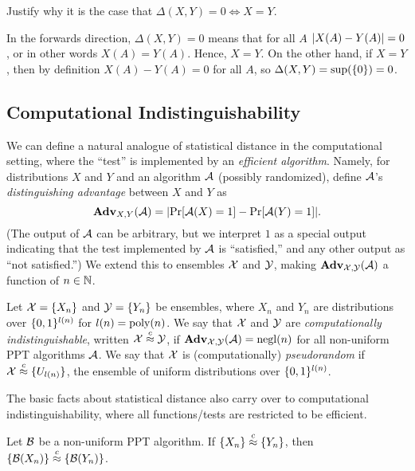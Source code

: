 \documentclass[11pt]{article}
\begin{document}
\begin{question}
    Justify why it is the case that $\Delta(X,Y) = 0 \iff X = Y$.
\end{question}
\begin{answer}
    In the forwards direction, $\Delta(X,Y) = 0$ means that for all $A$ $\lvert X(A) -
    Y(A)\rvert = 0$, or in other words $X(A) = Y(A)$. Hence, $X = Y$. On the other hand,
    if $X = Y$, then by definition $X(A) - Y(A) = 0$ for all $A$, so $\Delta(X,Y)
    = \sup(\{0\}) = 0$.
\end{answer}

\subsection{Computational Indistinguishability}
\label{sec:comp-indist}

We can define a natural analogue of statistical distance in the
computational setting, where the ``test'' is implemented by an
\emph{efficient algorithm}.  Namely, for distributions $X$ and $Y$ and
an algorithm $\mathcal{A}$ (possibly randomized), define $\mathcal{A}$'s
\emph{distinguishing advantage} between $X$ and $Y$ as \[
\advan_{X,Y}(\Adv) = \abs*{\Pr[\Adv(X)=1] - \Pr[\Adv(Y)=1]}. \] (The
output of $\mathcal{A}$ can be arbitrary, but we interpret $1$ as a special
output indicating that the test implemented by $\mathcal{A}$ is
``satisfied,'' and any other output as ``not satisfied.'')  We extend
this to ensembles $\mathcal{X}$ and $\mathcal{Y}$, making
$\mathbf{Adv}_{\mathcal{X},\mathcal{Y}}(\mathcal{A})$ a function of $n \in \mathbb{N}$.

\begin{definition}
  \label{def:comp-ind}
  Let $\mathcal{X} = \{X_{n}\}$ and $\mathcal{Y} = \{Y_{n}\}$ be ensembles,
  where $X_{n}$ and $Y_{n}$ are distributions over $\{0,1\}^{l(n)}$ for
  $l(n) = \operatorname{poly}(n)$.  We say that $\mathcal{X}$ and $\mathcal{Y}$ are
  \emph{computationally indistinguishable}, written $\mathcal{X} \stackrel{c}{\approx}
  \mathcal{Y}$, if $\mathbf{Adv}_{\mathcal{X},\mathcal{Y}}(\mathcal{A}) = \operatorname{negl}(n)$ for all
  non-uniform PPT algorithms $\mathcal{A}$.  We say that $\mathcal{X}$ is
  (computationally) \emph{pseudorandom} if $\mathcal{X} \stackrel{c}{\approx}
  \{U_{l(n)}\}$, the ensemble of uniform distributions over
  $\{0,1\}^{l(n)}$.
\end{definition}

The basic facts about statistical distance also carry over to
computational indistinguishability, where all functions/tests are
restricted to be efficient.

\begin{lemma}
  \label{lem:closure}
  Let $\mathcal{B}$ be a non-uniform PPT algorithm.  If $\{X_{n}\}
  \stackrel{c}{\approx} \{Y_{n}\}$, then $\{\mathcal{B}(X_{n})\} \stackrel{c}{\approx}
  \{\mathcal{B}(Y_{n})\}$.
\end{lemma}
\end{document}
